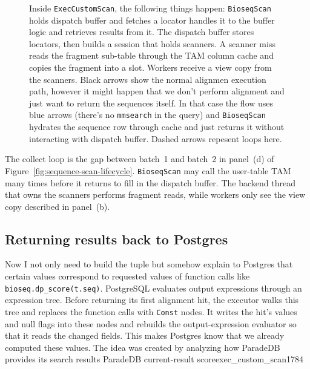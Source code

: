 \begin{figure}[htbp]
\caption{Inside \texttt{ExecCustomScan}, the following things happen:
\texttt{BioseqScan} holds dispatch buffer and fetches a locator handles it to the buffer logic and retrieves results from it.
The dispatch buffer stores locators, then builds a session that holds scanners.
A scanner miss reads the fragment sub-table through the TAM column cache and copies the fragment into a slot.
Workers receive a view copy from the scanners.
Black arrows show the normal alignmen execution path, however it might happen that we don't perform alignment and just want to return the sequences itself.
In that case the flow uses blue arrows (there's no \texttt{mmsearch} in the query) and \texttt{BioseqScan} hydrates the sequence row through cache and just returns it without interacting with dispatch buffer.
Dashed arrows repesent loops here.}
\label{fig:execcustomscan-dispatch}
\end{figure}

The collect loop is the gap between batch~1 and batch~2 in panel~(d) of Figure~\ref{fig:sequence-scan-lifecycle}.
\texttt{BioseqScan} may call the user-table TAM many times before it returns to fill in the dispatch buffer.
The backend thread that owns the scanners performs fragment reads, while workers only see the view copy described in panel~(b).

\subsection{Returning results back to Postgres}

Now I not only need to build the tuple but somehow explain to Postgres that certain values correspond to requested values of function calls like \texttt{bioseq.dp\_score(t.seq)}.
PostgreSQL evaluates output expressions through an expression tree. Before
returning its first alignment hit, the executor walks this tree and replaces the function calls with \texttt{Const} nodes. 
It writes the hit's values and null flags
into these nodes and rebuilds the output-expression evaluator so that it
reads the changed fields.
This makes Postgres know that we already computed these values. The idea was created by analyzing how ParadeDB provides its search results
{ParadeDB current-result score}{exec_custom_scan}{1784}

